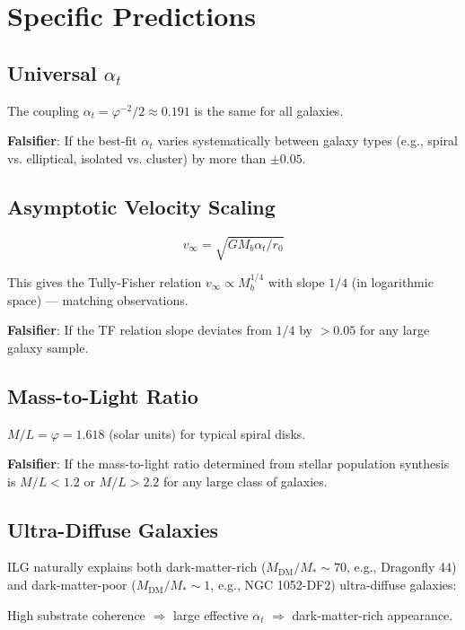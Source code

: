 \documentclass[12pt,a4paper]{article}
\theoremstyle{definition}
\theoremstyle{remark}
\begin{document}
\section{Specific Predictions}

\subsection{Universal $\alpha_t$}

The coupling $\alpha_t = \varphi^{-2}/2 \approx 0.191$ is the same for all galaxies.

\textbf{Falsifier}: If the best-fit $\alpha_t$ varies systematically between galaxy 
types (e.g., spiral vs. elliptical, isolated vs. cluster) by more than $\pm 0.05$.

\subsection{Asymptotic Velocity Scaling}

\begin{equation}
v_\infty = \sqrt{G M_b \alpha_t / r_0}
\end{equation}

This gives the Tully-Fisher relation $v_\infty \propto M_b^{1/4}$ with slope $1/4$ 
(in logarithmic space) — matching observations.

\textbf{Falsifier}: If the TF relation slope deviates from $1/4$ by $> 0.05$ for any 
large galaxy sample.

\subsection{Mass-to-Light Ratio}

$M/L = \varphi = 1.618$ (solar units) for typical spiral disks.

\textbf{Falsifier}: If the mass-to-light ratio determined from stellar population 
synthesis is $M/L < 1.2$ or $M/L > 2.2$ for any large class of galaxies.

\subsection{Ultra-Diffuse Galaxies}

ILG naturally explains both dark-matter-rich ($M_\mathrm{DM}/M_* \sim 70$, 
e.g., Dragonfly 44) and dark-matter-poor ($M_\mathrm{DM}/M_* \sim 1$, 
e.g., NGC 1052-DF2) ultra-diffuse galaxies:

High substrate coherence $\Rightarrow$ large effective $\alpha_t$ $\Rightarrow$ 
dark-matter-rich appearance.
\end{document}
